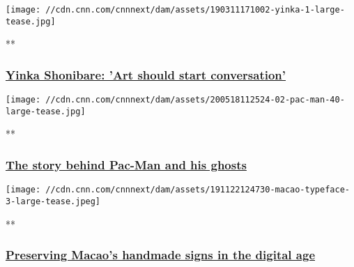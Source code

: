 \href{/videos/arts/2019/03/11/yinka-shonibare-artist-profile-avant-garde-africa-lon-orig.cnn/video/playlists/cnn-style/}{}

\texttt{[image: //cdn.cnn.com/cnnnext/dam/assets/190311171002-yinka-1-large-tease.jpg]}

**

\hypertarget{yinka-shonibare-art-should-start-conversation}{%
\subsubsection{\texorpdfstring{\href{/videos/arts/2019/03/11/yinka-shonibare-artist-profile-avant-garde-africa-lon-orig.cnn/video/playlists/cnn-style/}{Yinka
Shonibare: 'Art should start
conversation'}}{Yinka Shonibare: 'Art should start conversation'}}\label{yinka-shonibare-art-should-start-conversation}}

\href{/videos/design/2020/05/20/pacman-creator-toru-iwatani-interview-lon-orig.cnn/video/playlists/cnn-style/}{}

\texttt{[image: //cdn.cnn.com/cnnnext/dam/assets/200518112524-02-pac-man-40-large-tease.jpg]}

**

\hypertarget{the-story-behind-pac-man-and-his-ghosts-}{%
\subsubsection{\texorpdfstring{\href{/videos/design/2020/05/20/pacman-creator-toru-iwatani-interview-lon-orig.cnn/video/playlists/cnn-style/}{The
story behind Pac-Man and his ghosts
}}{The story behind Pac-Man and his ghosts }}\label{the-story-behind-pac-man-and-his-ghosts-}}

\href{/videos/arts/2019/11/22/artisans-macao-typography-signs-style-orig.cnn/video/playlists/cnn-style/}{}

\texttt{[image: //cdn.cnn.com/cnnnext/dam/assets/191122124730-macao-typeface-3-large-tease.jpeg]}

**

\hypertarget{preserving-macaos-handmade-signs-in-the-digital-age}{%
\subsubsection{\texorpdfstring{\href{/videos/arts/2019/11/22/artisans-macao-typography-signs-style-orig.cnn/video/playlists/cnn-style/}{Preserving
Macao's handmade signs in the digital
age}}{Preserving Macao's handmade signs in the digital age}}\label{preserving-macaos-handmade-signs-in-the-digital-age}}

